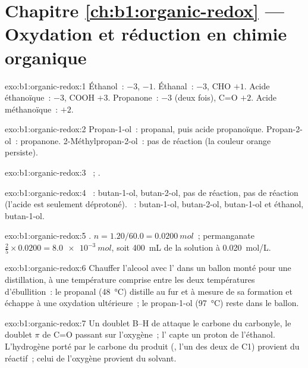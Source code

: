 \section*{Chapitre \ref{ch:b1:organic-redox} --- Oxydation et réduction en chimie organique}

\begin{solution}{exo:b1:organic-redox:1}
Éthanol~:  $-3$,  $-1$. Éthanal~:  $-3$, CHO $+1$.
Acide éthanoïque~:  $-3$, COOH $+3$. Propanone~:  $-3$
(deux fois),
C=O $+2$. Acide méthanoïque~: $+2$.
\end{solution}

\begin{solution}{exo:b1:organic-redox:2}
Propan-1-ol~: propanal, puis acide propanoïque. Propan-2-ol~: propanone.
2-Méthylpropan-2-ol~: pas de réaction (la couleur orange persiste).
\end{solution}

\begin{solution}{exo:b1:organic-redox:3}
~;
.
\end{solution}

\begin{solution}{exo:b1:organic-redox:4}
~: butan-1-ol, butan-2-ol, pas de réaction, pas de réaction
(l'acide est seulement déprotoné). ~: butan-1-ol, butan-2-ol,
butan-1-ol et éthanol, butan-1-ol.
\end{solution}

\begin{solution}{exo:b1:organic-redox:5}
.
$n = 1.20/60.0 = \qty{0.0200}{mol}$~; permanganate $\frac25 \times 0.0200 =
\qty{8.0e-3}{mol}$, soit \qty{400}{mL} de la solution à \qty{0.020}{mol/L}.
\end{solution}

\begin{solution}{exo:b1:organic-redox:6}
Chauffer l'alcool avec l' dans un ballon monté pour une
distillation, à une température comprise entre les deux températures
d'ébullition~: le propanal (\qty{48}{\celsius}) distille au fur et à
mesure de sa formation et échappe à une oxydation ultérieure~; le
propan-1-ol (\qty{97}{\celsius}) reste dans le ballon.
\end{solution}

\begin{solution}{exo:b1:organic-redox:7}
Un doublet B--H de  attaque le carbone du carbonyle, le
doublet $\pi$ de C=O passant sur l'oxygène~; l' capte un proton
de l'éthanol. L'hydrogène porté par le carbone du produit
(, l'un des deux de C1) provient du réactif~; celui de
l'oxygène provient du solvant.
\end{solution}

